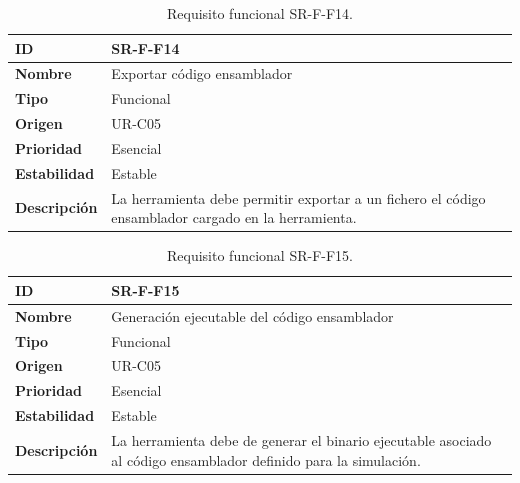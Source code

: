 \begin{center}
\begin{table}[htbp]
\centering
\caption{Requisito funcional SR-F-F14.}
\begin{tabular}{@{}p{2.5cm} p{9cm}@{}} 
\toprule
\textbf{ID} 				& SR-F-F14 \\
\midrule
\textbf{Nombre} 			& Exportar código ensamblador\\
\midrule
\textbf{Tipo} 			& Funcional \\
\midrule
\textbf{Origen} 			& UR-C05 \\
\midrule
\textbf{Prioridad}		& Esencial \\
\midrule
\textbf{Estabilidad} 		& Estable \\
\midrule
\textbf{Descripción} 	& La herramienta debe permitir exportar a un fichero el código ensamblador cargado en la herramienta. \\
\bottomrule
\end{tabular}
\label{tab:srff14}
\end{table}
\end{center}

\begin{center}
\begin{table}[htbp]
\centering
\caption{Requisito funcional SR-F-F15.}
\begin{tabular}{@{}p{2.5cm} p{9cm}@{}} 
\toprule
\textbf{ID} 				& SR-F-F15 \\
\midrule
\textbf{Nombre} 			& Generación ejecutable del código ensamblador\\
\midrule
\textbf{Tipo} 			& Funcional \\
\midrule
\textbf{Origen} 			& UR-C05 \\
\midrule
\textbf{Prioridad}		& Esencial \\
\midrule
\textbf{Estabilidad} 		& Estable \\
\midrule
\textbf{Descripción} 	& La herramienta debe de generar el binario ejecutable asociado al código ensamblador definido para la simulación. \\
\bottomrule
\end{tabular}
\label{tab:srff15}
\end{table}
\end{center}

